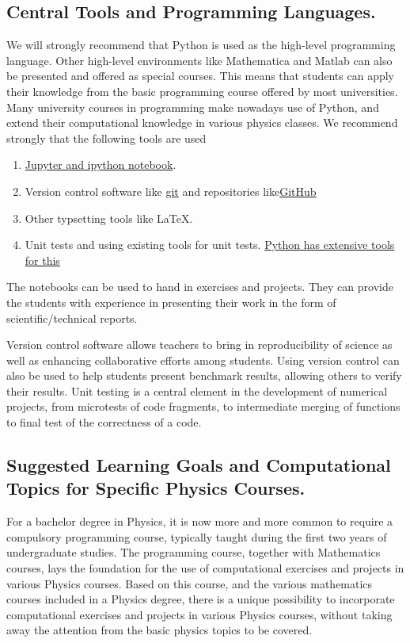\documentclass[graybox,envcountchap,sectrefs]{svmult}
\begin{document}
\subsection{Central Tools and Programming Languages.}
We will strongly recommend that Python is used as the high-level
 programming language. Other high-level environments like Mathematica
 and Matlab can also be presented and offered as special courses. This
 means that students can apply their knowledge from the basic programming course offered by most universities.
Many university courses in programming  make nowadays use of Python, and extend their computational knowledge in
 various physics classes. We recommend strongly that the following
 tools are used 
\begin{enumerate}
\item \href{{http://jupyter.org/}}{Jupyter and ipython notebook}.  

\item Version control software like \href{{https://git-scm.com/}}{git} and repositories like\href{{https://github.com/}}{GitHub} 

\item Other typsetting tools like {\LaTeX}.

\item Unit tests and using existing tools for unit tests. \href{{https://docs.python.org/2/library/unittest.html}}{Python has extensive tools for this}
\end{enumerate}


The notebooks can be used to hand in exercises and projects. They can
provide the students with experience in presenting their work in the
form of scientific/technical reports.

Version control software allows teachers to bring in reproducibility
of science as well as enhancing collaborative efforts among
students. Using version control can also be used to help students
present benchmark results, allowing others to verify their
results. Unit testing is a central element in the development of
numerical projects, from microtests of code fragments, to intermediate
merging of functions to final test of the correctness of a code.

\subsection{Suggested Learning Goals and Computational Topics for Specific Physics Courses.}
For a bachelor degree in Physics, it is now more and more common to require a compulsory
programming course, typically taught during the first two years of
undergraduate studies. The programming course, together with
Mathematics courses, lays the foundation for the use of computational
exercises and projects in various Physics courses. Based on this
course, and the various mathematics courses included in a Physics
degree, there is a unique possibility to incorporate computational
exercises and projects in various Physics courses, without taking away
the attention from the basic physics topics to be covered.
\end{document}
